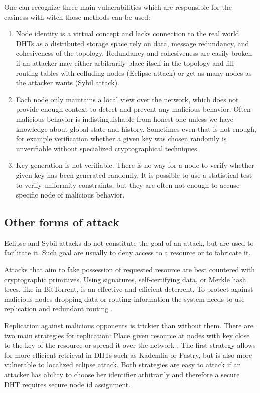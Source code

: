   One can recognize three main vulnerabilities which are responsible for the
  easiness with witch those methods can be used:

  \begin{enumerate}
    \item Node identity is a virtual concept and lacks connection to the real
      world. DHTs as a distributed storage space rely on data, message
      redundancy, and cohesiveness of the topology. Redundancy and cohesiveness
      are easily broken if an attacker may either arbitrarily place itself in
      the topology and fill routing tables with colluding nodes (Eclipse attack)
      or get as many nodes as the attacker wants (Sybil attack).

    \item Each node only maintains a local view over the network, which does not
      provide enough context to detect and prevent any malicious behavior. Often
      malicious behavior is indistinguishable from honest one unless we have
      knowledge about global state and history.  Sometimes even that is not
      enough, for example verification whether a given key was chosen randomly
      is unverifiable without specialized cryptographical techniques. 

   \item  Key generation is not verifiable. There is no way for a node to verify
     whether given key has been generated randomly. It is possible to use a
     statistical test to verify uniformity constraints, but they are often not
     enough to accuse specific node of malicious behavior.
  \end{enumerate}

\subsection{Other forms of attack}
  Eclipse and Sybil attacks do not constitute the goal of an attack, but are
  used to facilitate it. Such goal are usually to deny access to a resource or
  to fabricate it.

  Attacks that aim to fake possession of requested resource are best countered
  with cryptographic primitives. Using signatures, self-certifying data, or
  Merkle hash trees, like in BitTorrent, is an effective and efficient
  deterrent. To protect against malicious nodes dropping data or routing
  information the system needs to use replication and redundant routing
  \cite{dou02}. 

  Replication against malicious opponents is trickier than without them. There
  are two main strategies for replication: Place given resource at nodes with
  key close to the key of the resource or spread it over the network \cite[p.
  38]{urd11}. The first strategy allows for more efficient retrieval in DHTs
  such as Kademlia or Pastry, but is also more vulnerable to localized eclipse
  attack. Both strategies are easy to attack if an attacker has ability to
  choose her identifier arbitrarily and therefore a secure DHT requires secure
  node id assignment.

